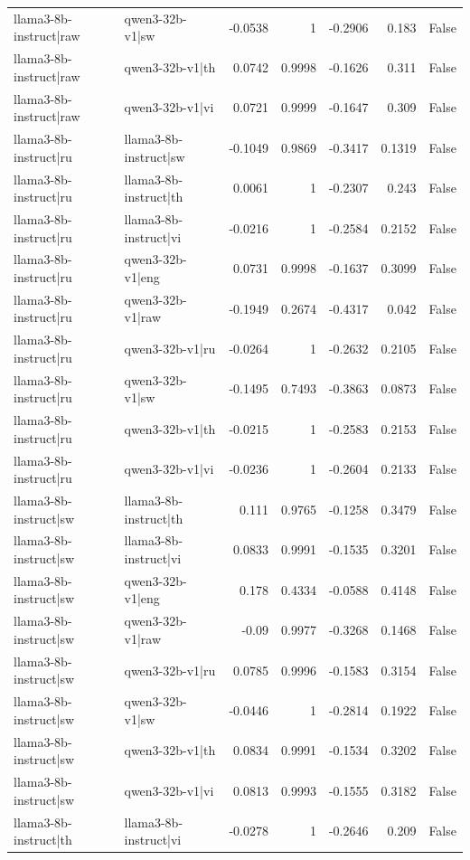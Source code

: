\begin{table}
\begin{tabular}{l l r r r r l}
llama3-8b-instruct|raw & qwen3-32b-v1|sw & -0.0538 & 1 & -0.2906 & 0.183 & False \\
llama3-8b-instruct|raw & qwen3-32b-v1|th & 0.0742 & 0.9998 & -0.1626 & 0.311 & False \\
llama3-8b-instruct|raw & qwen3-32b-v1|vi & 0.0721 & 0.9999 & -0.1647 & 0.309 & False \\
llama3-8b-instruct|ru & llama3-8b-instruct|sw & -0.1049 & 0.9869 & -0.3417 & 0.1319 & False \\
llama3-8b-instruct|ru & llama3-8b-instruct|th & 0.0061 & 1 & -0.2307 & 0.243 & False \\
llama3-8b-instruct|ru & llama3-8b-instruct|vi & -0.0216 & 1 & -0.2584 & 0.2152 & False \\
llama3-8b-instruct|ru & qwen3-32b-v1|eng & 0.0731 & 0.9998 & -0.1637 & 0.3099 & False \\
llama3-8b-instruct|ru & qwen3-32b-v1|raw & -0.1949 & 0.2674 & -0.4317 & 0.042 & False \\
llama3-8b-instruct|ru & qwen3-32b-v1|ru & -0.0264 & 1 & -0.2632 & 0.2105 & False \\
llama3-8b-instruct|ru & qwen3-32b-v1|sw & -0.1495 & 0.7493 & -0.3863 & 0.0873 & False \\
llama3-8b-instruct|ru & qwen3-32b-v1|th & -0.0215 & 1 & -0.2583 & 0.2153 & False \\
llama3-8b-instruct|ru & qwen3-32b-v1|vi & -0.0236 & 1 & -0.2604 & 0.2133 & False \\
llama3-8b-instruct|sw & llama3-8b-instruct|th & 0.111 & 0.9765 & -0.1258 & 0.3479 & False \\
llama3-8b-instruct|sw & llama3-8b-instruct|vi & 0.0833 & 0.9991 & -0.1535 & 0.3201 & False \\
llama3-8b-instruct|sw & qwen3-32b-v1|eng & 0.178 & 0.4334 & -0.0588 & 0.4148 & False \\
llama3-8b-instruct|sw & qwen3-32b-v1|raw & -0.09 & 0.9977 & -0.3268 & 0.1468 & False \\
llama3-8b-instruct|sw & qwen3-32b-v1|ru & 0.0785 & 0.9996 & -0.1583 & 0.3154 & False \\
llama3-8b-instruct|sw & qwen3-32b-v1|sw & -0.0446 & 1 & -0.2814 & 0.1922 & False \\
llama3-8b-instruct|sw & qwen3-32b-v1|th & 0.0834 & 0.9991 & -0.1534 & 0.3202 & False \\
llama3-8b-instruct|sw & qwen3-32b-v1|vi & 0.0813 & 0.9993 & -0.1555 & 0.3182 & False \\
llama3-8b-instruct|th & llama3-8b-instruct|vi & -0.0278 & 1 & -0.2646 & 0.209 & False \\

\end{tabular}
\end{table}
